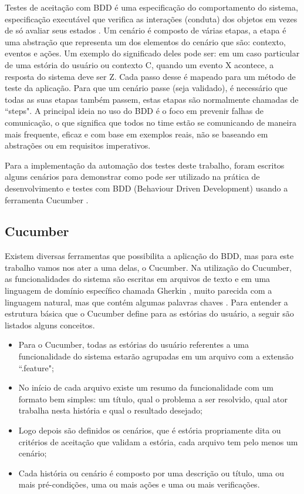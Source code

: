 \begin{itemize}
Testes de aceitação com BDD é uma especificação do comportamento do sistema, especificação executável que verifica as interações (conduta) dos objetos em vezes de só avaliar seus estados \cite{bddIntroducing}. Um cenário é composto de várias etapas, a etapa é uma abstração que representa um dos elementos do cenário que são: contexto, eventos e ações. Um exemplo do significado deles pode ser: em um caso particular de uma estória do usuário ou contexto C, quando um evento X acontece, a resposta do sistema deve ser Z. Cada passo desse é mapeado para um método de teste da aplicação. Para que um cenário passe (seja validado), é necessário que todas as suas etapas também passem, estas etapas são normalmente chamadas de ``steps". A principal ideia no uso do BDD é o foco em prevenir falhas de comunicação, o que significa que todos no time estão se comunicando de maneira mais frequente, eficaz e com base em exemplos reais, não se baseando em abstrações ou em requisitos imperativos. 

Para a implementação da automação dos testes deste trabalho, foram escritos alguns cenários para demonstrar como pode ser utilizado na prática de desenvolvimento e testes com BDD (Behaviour Driven Development) usando a ferramenta Cucumber \cite{Cucumber}.
\end{itemize}

\subsection{Cucumber}

Existem diversas ferramentas que possibilita a aplicação do BDD, mas para este trabalho vamos nos ater a uma delas, o Cucumber. Na utilização do Cucumber, as funcionalidades do sistema são escritas em arquivos de texto e em uma linguagem de domínio específico chamada Gherkin \cite{gherkin}, muito parecida com a linguagem natural, mas que contém algumas palavras chaves \cite{Cucumber}.  Para entender a estrutura básica que o Cucumber define para as estórias do usuário, a seguir são listados alguns conceitos.

\begin{itemize}

	\item Para o Cucumber, todas as  estórias do usuário referentes a uma funcionalidade do sistema estarão agrupadas em um arquivo com a extensão ``.feature";
	\item No início de cada arquivo existe um resumo da funcionalidade com um formato bem simples: um título, qual o problema a ser resolvido, qual ator trabalha nesta história e qual o resultado desejado;
	\item Logo depois são definidos os cenários, que é estória propriamente dita ou critérios de aceitação que validam a estória, cada arquivo tem pelo menos um cenário;
	\item Cada história ou cenário é composto por uma descrição ou título, uma ou mais pré-condições, uma ou mais ações e uma ou mais verificações.
\end{itemize}

